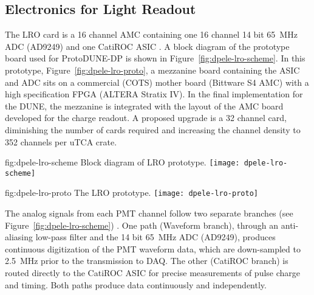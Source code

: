 \subsection{Electronics for Light Readout}
\label{sec:fddp-tpc-elec-design-lro}

%
The LRO card is a \num{16} channel AMC containing one \num{16} channel \num{14} bit \SI{65}{\MHz} ADC (AD9249) and one CatiROC ASIC \cite{catiroc}. A block diagram of the prototype board used for ProtoDUNE-DP is shown in Figure~\ref{fig:dpele-lro-scheme}. In this prototype, Figure~\ref{fig:dpele-lro-proto}, a mezzanine board containing the ASIC and ADC sits on a commercial (COTS) mother board (Bittware S4 AMC) with a high specification FPGA (ALTERA Stratix IV). In the final implementation for the DUNE, the mezzanine is integrated with the layout of the AMC board developed for the charge readout.  
A proposed upgrade is a \num{32} channel card, diminishing the number of cards required and increasing the channel density to \num{352} channels per uTCA crate.

\begin{dunefigure}{fig:dpele-lro-scheme}
{Block diagram of LRO prototype.}
\texttt{[image: dpele-lro-scheme]}
\end{dunefigure}

\begin{dunefigure}{fig:dpele-lro-proto}
{The LRO prototype.}
\texttt{[image: dpele-lro-proto]}
\end{dunefigure}

The analog signals from each PMT channel follow two separate branches (see Figure~\ref{fig:dpele-lro-scheme}) . One path (Waveform branch), through an anti-aliasing low-pass filter and the \num{14} bit \SI{65}{\MHz} ADC (AD9249), produces continuous digitization of the PMT waveform data, which are down-sampled to \SI{2.5}{MHz} prior to the transmission to DAQ. The other (CatiROC branch) is routed directly to the CatiROC ASIC for precise measurements of pulse charge and timing. Both paths produce data continuously and independently.


